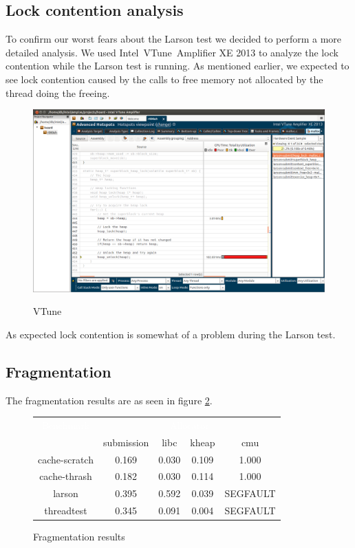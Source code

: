 \documentclass[oneside]{amsart}
\theoremstyle{definition}
\theoremstyle{remark}
\numberwithin{equation}{section}
\begin{document}
\subsection{Lock contention analysis}
To confirm our worst fears about the Larson test we decided to perform a more detailed analysis. We
used Intel\textregistered\ VTune\texttrademark\ Amplifier XE 2013 to analyze the lock contention
while the Larson test is running. As mentioned earlier, we expected to see lock contention caused by
the calls to free memory not allocated by the thread doing the freeing.

\begin{figure}[h]
    \caption{VTune}
    \centering
    \includegraphics[scale=0.28]{VTune.png}
    \label{fig:vtune}
\end{figure}

As expected lock contention is somewhat of a problem during the Larson test.

\newpage

\subsection{Fragmentation}

The fragmentation results are as seen in figure \ref{fig:fragmentation}.

\begin{figure}[h]
    \caption{Fragmentation results}
    \centering
    \begin{tabular}{|c|cccc|}
        \rowcolor{black!80}
        \textcolor{white}{Benchmark} & \multicolumn{4}{|c|}{\textcolor{white}{Allocator}} \\
                      & submission & libc  & kheap & cmu   \\
        \hline
        cache-scratch & 0.169      & 0.030 & 0.109 & 1.000    \\
        cache-thrash  & 0.182      & 0.030 & 0.114 & 1.000    \\
        larson        & 0.395      & 0.592 & 0.039 & SEGFAULT \\
        threadtest    & 0.345      & 0.091 & 0.004 & SEGFAULT \\
        \hline
    \end{tabular}
    \label{fig:fragmentation}
\end{figure}
\end{document}
